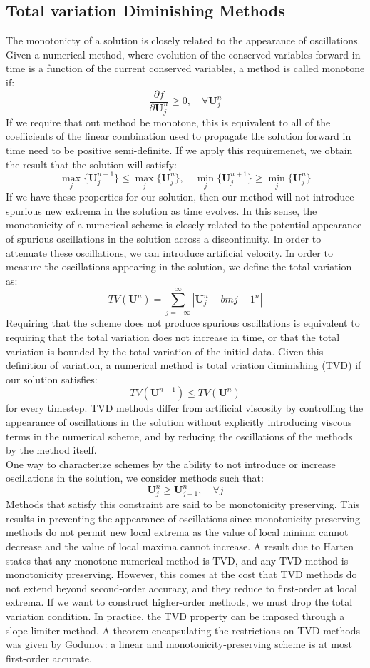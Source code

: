 \subsection{Total variation Diminishing Methods}
The monotonicty of a solution is closely related to the appearance of oscillations. Given a numerical method, where evolution of the conserved variables forward in time is a function of the current conserved variables, a method is called monotone if:
$$\frac{\partial f}{\partial \bm{U}_j^n}\geq 0,\quad \forall \bm{U}_j^n$$
If we require that out method be monotone, this is equivalent to all of the coefficients of the linear combination used to propagate the solution forward in time need to be positive semi-definite. If we apply this requiremenet, we obtain the result that the solution will satisfy:
$$\max_j\{\bm{U}_j^{n+1}\}\leq \max_j\{\bm{U}_j^n\},\quad \min_j\{\bm{U}_j^{n+1}\}\geq \min_j\{\bm{U}_j^n\}$$
If we have these properties for our solution, then our method will not introduce spurious new extrema in the solution as time evolves. In this sense, the monotonicity of a numerical scheme is closely related to the potential appearance of spurious oscillations in the solution across a discontinuity. In order to attenuate these oscillations, we can introduce artificial velocity. In order to measure the oscillations appearing in the solution, we define the total variation as:
$$TV(\bm{U}^n)=\sum_{j=-\infty}^{\infty}|\bm{U}_j^n-bm{j-1}^n|$$
Requiring that the scheme does not produce spurious oscillations is equivalent to requiring that the total variation does not increase in time, or that the total variation is bounded by the total variation of the initial data. Given this definition of variation, a numerical method is total vriation diminishing (TVD) if our solution satisfies:
$$TV(\bm{U}^{n+1})\leq TV(\bm{U}^n)$$ 
for every timestep. TVD methods differ from artificial viscosity by controlling the appearance of oscillations in the solution without explicitly introducing viscous terms in the numerical scheme, and by reducing the oscillations of the methods by the method itself. \\
One way to characterize schemes by the ability to not introduce or increase oscillations in the solution, we consider methods such that:
$$\bm{U}_j^n\geq \bm{U}_{j+1}^n,\quad \forall j$$
Methods that satisfy this constraint are said to be monotonicity preserving. This results in preventing the appearance of oscillations since monotonicity-preserving methods do not permit new local extrema as the value of local minima cannot decrease and the value of local maxima cannot increase. A result due to Harten states that any monotone numerical method is TVD, and any TVD method is monotonicity preserving. However, this comes at the cost that TVD methods do not extend beyond second-order accuracy, and they reduce to first-order at local extrema. If we want to construct higher-order methods, we must drop the total variation condition. In practice, the TVD property can be imposed through a slope limiter method. A theorem encapsulating the restrictions on TVD methods was given by Godunov: a linear and monotonicity-preserving scheme is at most first-order accurate. \\
